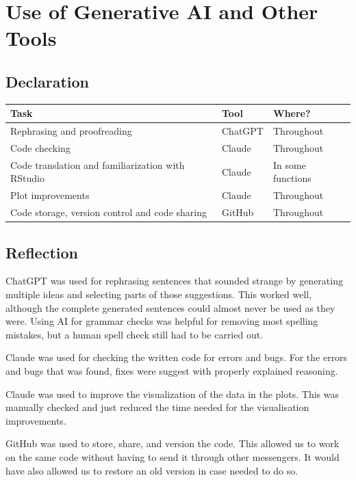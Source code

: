 \documentclass[12pt,a4paper]{article}
\begin{document}
\section{Use of Generative AI and Other Tools}

\subsection{Declaration}

\begin{center}
\begin{tabular}{lll}
    \toprule
    Task & Tool & Where? \\
    \midrule
    Rephrasing and proofreading
        & ChatGPT & Throughout \\
    Code checking
        & Claude & Throughout \\
    Code translation and familiarization with RStudio
        & Claude & In some functions \\
    Plot improvements
        & Claude & Throughout \\
    Code storage, version control and code sharing
        & GitHub & Throughout \\
    \bottomrule
\end{tabular}
\end{center}

\subsection{Reflection}

ChatGPT was used for rephrasing sentences that sounded strange by generating
multiple ideas and selecting parts of those suggestions. This worked well,
although the complete generated sentences could almost never be used as they
were. Using AI for grammar checks was helpful for removing most spelling
mistakes, but a human spell check still had to be carried out.

Claude was used for checking the written code for errors and bugs. For the errors and bugs that was found, fixes were suggest with properly explained reasoning. 

Claude was used to improve the visualization of the data in the plots. This was manually checked and just reduced the time needed for the visualisation improvements.


GitHub was used to store, share, and version the code. This allowed us to work on the same code without having to send it through other messengers. It would have also allowed us to restore an old version in case needed to do so.
\end{document}
